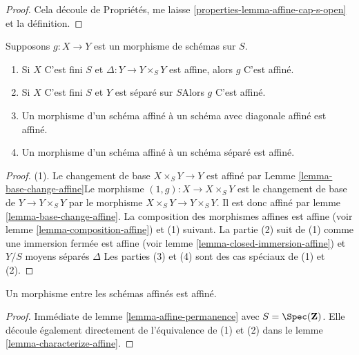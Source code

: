 \begin{proof}

Cela découle de Propriétés, me laisse \ref{properties-lemma-affine-cap-s-open}
et la définition.

\end{proof}

\begin{lemma}

\label{lemma-affine-permanence}

Supposons $g : X \to Y$ est un morphisme de schémas sur $S$.

\begin{enumerate}

\item Si $X$ C'est fini $S$ et $\Delta : Y \to Y \times_S Y$ est affine, alors $g$ C'est affiné.
\item Si $X$ C'est fini $S$ et $Y$ est séparé sur $S$Alors $g$ C'est affiné.
\item Un morphisme d'un schéma affiné à un schéma avec diagonale affiné est affiné.
\item Un morphisme d'un schéma affiné à un schéma séparé est affiné.

\end{enumerate}

\end{lemma}

\begin{proof}

(1). Le changement de base $X \times_S Y \to Y$ est affiné par Lemme \ref{lemma-base-change-affine}Le morphisme $(1, g) : X \to X \times_S Y$ est le changement de base de
$Y \to Y \times_S Y$ par le morphisme $X \times_S Y \to Y \times_S Y$. Il est donc affiné par lemme \ref{lemma-base-change-affine}. La composition des morphismes affines est affine (voir lemme \ref{lemma-composition-affine}) et (1) suivant. La partie (2) suit de (1) comme une immersion fermée est affine (voir lemme \ref{lemma-closed-immersion-affine}) et $Y/S$ moyens séparés $\Delta$ Les parties (3) et (4) sont des cas spéciaux de (1) et (2).

\end{proof}

\begin{lemma}

\label{lemma-morphism-affines-affine}
Un morphisme entre les schémas affinés est affiné.
\end{lemma}

\begin{proof}
Immédiate de lemme \ref{lemma-affine-permanence} avec $S = \Spec(\mathbf{Z})$. Elle découle également directement de l'équivalence de (1) et (2) dans le lemme \ref{lemma-characterize-affine}.
\end{proof}

